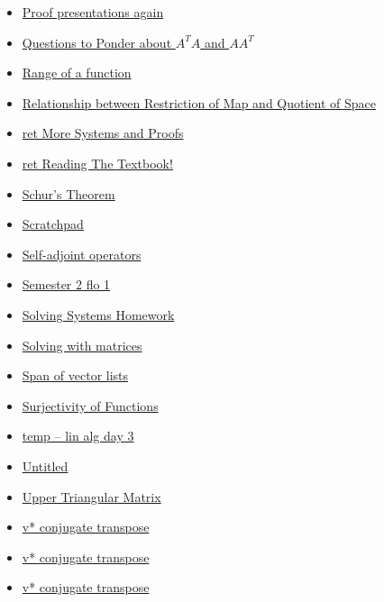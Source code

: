 \documentclass[11pt]{article}
\begin{document}
\begin{itemize}
\begin{itemize}
\begin{itemize}
\item \href{mathematics/linear\_algebra/KBe20math530flo15.org}{Proof presentations again}
\item \href{mathematics/linear\_algebra/KBe21math530retMatrixTransposePonderQuestions.org}{Questions to Ponder about \(A^TA\) and \(AA^T\)}
\item \href{mathematics/linear\_algebra/KBrefFunctionRange.org}{Range of a function}
\item \href{mathematics/linear\_algebra/KBcrefRestrictionAndQuotientOperators.org}{Relationship between Restriction of Map and Quotient of Space}
\item \href{mathematics/linear\_algebra/KBe20math530retMoreSystemsAndProofs.org}{ret More Systems and Proofs}
\item \href{mathematics/linear\_algebra/20math530retReadingTheTextbook.org}{ret Reading The Textbook!}
\item \href{mathematics/linear\_algebra/KBrefSchursTheorem.org}{Schur's Theorem}
\item \href{mathematics/linear\_algebra/20math530retScratchpad.org}{Scratchpad}
\item \href{mathematics/linear\_algebra/KBrefSelfAdjointOperators.org}{Self-adjoint operators}
\item \href{mathematics/linear\_algebra/KB20math530flo2\_1.org}{Semester 2 flo 1}
\item \href{mathematics/linear\_algebra/KBxSolvingSystems.org}{Solving Systems Homework}
\item \href{mathematics/linear\_algebra/20math530retSolvingWithMatrices.org}{Solving with matrices}
\item \href{mathematics/linear\_algebra/KBe20math530refSpan.org}{Span of vector lists}
\item \href{mathematics/linear\_algebra/KBrefSurjectiveFunction.org}{Surjectivity of Functions}
\item \href{mathematics/linear\_algebra/KBxChapter1aReview.org}{temp -- lin alg day 3}
\item \href{mathematics/linear\_algebra/Untitled.org}{Untitled}
\item \href{mathematics/linear\_algebra/KBrefUpperTriangularMatrix.org}{Upper Triangular Matrix}
\item \href{mathematics/linear\_algebra/KBrefVectorStar.org}{v* conjugate transpose}
\item \href{mathematics/linear\_algebra/other.org}{v* conjugate transpose}
\item \href{mathematics/linear\_algebra/other2.org}{v* conjugate transpose}

\end{itemize}
\end{itemize}
\end{itemize}
\end{document}

